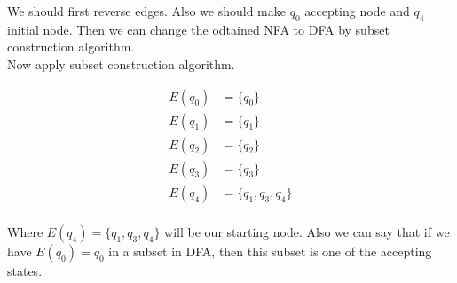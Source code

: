 \documentclass[12pt]{article}
\begin{document}
We should first reverse edges. Also we should make $q_0$ accepting node and $q_4$ initial node. Then we can change the odtained NFA to DFA by subset construction algorithm.\\

Now apply subset construction algorithm.

\begin{align*}
	E(q_0) & = \{q_0\} \\ 
	E(q_1) & = \{q_1\} \\
	E(q_2) & = \{q_2\} \\
	E(q_3) & = \{q_3\} \\
	E(q_4) & = \{q_1, q_3, q_4\} \\
\end{align*}

Where $E(q_4)=\{q_1, q_3, q_4\}$ will be our starting node. Also we can say that if we have $E(q_0)=q_0$ in a subset in DFA, then this subset is one of the accepting states.\\
\end{document}
